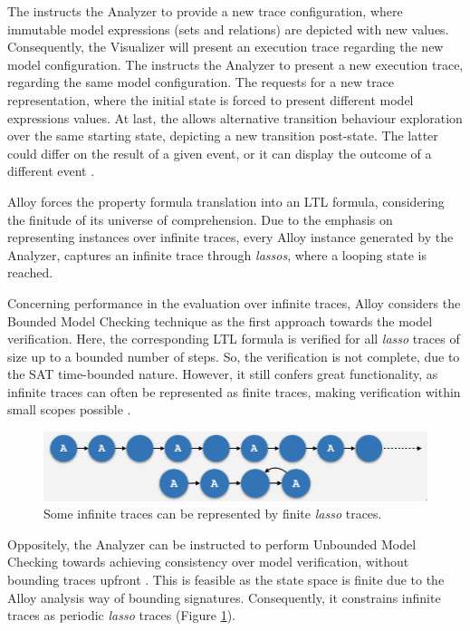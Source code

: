 The  instructs the Analyzer to provide a new trace configuration, where immutable model expressions (sets and relations) are depicted with new values. Consequently, the Visualizer will present an execution trace regarding the new model configuration. The  instructs the Analyzer to present a new execution trace, regarding the same model configuration. The  requests for a new trace representation, where the initial state is forced to present different model expressions values. At last, the  allows alternative transition behaviour exploration over the same starting state, depicting a new transition post-state. The latter could differ on the result of a given event, or it can display the outcome of a different event \cite{alloy-docs}.

Alloy forces the property formula translation into an LTL formula, considering the finitude of its universe of comprehension. Due to the emphasis on representing instances over infinite traces, every Alloy instance generated by the Analyzer, captures an infinite trace through \textit{lassos}, where a looping state is reached.

Concerning performance in the evaluation over infinite traces, Alloy considers the Bounded Model Checking technique as the first approach towards the model verification. Here, the corresponding LTL formula is verified for all \textit{lasso} traces of size up to a bounded number of steps. So, the verification is not complete, due to the SAT time-bounded nature. However, it still confers great functionality, as infinite traces can often be represented as finite traces, making verification within small scopes possible \cite{jackson2012software}.

\begin{figure}[H]
    \centering
    \includegraphics[width=0.7\linewidth]{images/alloy_infinite_trace.png}
    \caption{Some infinite traces can be represented by finite \textit{lasso} traces.}
    \label{fig:alloy-infinite}
\end{figure}

Oppositely, the Analyzer can be instructed to perform Unbounded Model Checking towards achieving consistency over model verification, without bounding traces upfront \cite{alloy-6, alloy-docs}. This is feasible as the state space is finite due to the Alloy analysis way of bounding signatures. Consequently, it constrains infinite traces as periodic \textit{lasso} traces (Figure \ref{fig:alloy-infinite}).


